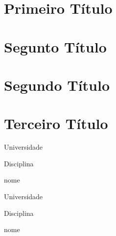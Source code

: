 \documentclass[oneside,a4paper,12pt]{article}
\begin{document}
\onehalfspacing

\maketitle

\begin{center}  \end{center}

\vspace{5pt}

\section*{Primeiro Título}
\lipsum[1-2]

\section*{Segunto Título}
\lipsum[2-3]

\section*{Segundo Título}
\lipsum[4-5]

\section*{Terceiro Título}
\lipsum[6-7]

\vspace{10pt}

\begin{flushleft}
Universidade

Disciplina

nome
\end{flushleft}

\begin{flushright}
    Universidade

    Disciplina
    
    nome        
\end{flushright}
\end{document}
